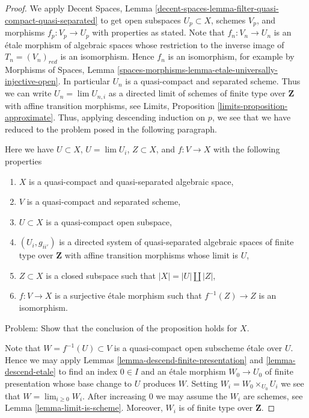 \begin{proof}
We apply Decent Spaces, Lemma
\ref{decent-spaces-lemma-filter-quasi-compact-quasi-separated}
to get open subspaces $U_p \subset X$, schemes $V_p$, and morphisms
$f_p : V_p \to U_p$ with properties as stated. Note that
$f_n : V_n \to U_n$ is an \'etale morphism of algebraic spaces
whose restriction to the inverse image of $T_n = (V_n)_{red}$ is an
isomorphism. Hence $f_n$ is an isomorphism, for example by
Morphisms of Spaces, Lemma
\ref{spaces-morphisms-lemma-etale-universally-injective-open}.
In particular $U_n$ is a quasi-compact and separated scheme.
Thus we can write $U_n = \lim U_{n, i}$ as a directed limit
of schemes of finite type over $\mathbf{Z}$ with affine transition
morphisms, see Limits, Proposition \ref{limits-proposition-approximate}.
Thus, applying descending induction on $p$, we see that we have reduced
to the problem posed in the following paragraph.

\medskip\noindent
Here we have $U \subset X$, $U = \lim U_i$, $Z \subset X$, and
$f : V \to X$ with the following properties
\begin{enumerate}
\item $X$ is a quasi-compact and quasi-separated algebraic space,
\item $V$ is a quasi-compact and separated scheme,
\item $U \subset X$ is a quasi-compact open subspace,
\item $(U_i, g_{ii'})$ is a directed system of quasi-separated algebraic spaces
of finite type over $\mathbf{Z}$ with affine transition morphisms
whose limit is $U$,
\item $Z \subset X$ is a closed subspace such that $|X| = |U| \amalg |Z|$,
\item $f : V \to X$ is a surjective \'etale morphism such that
$f^{-1}(Z) \to Z$ is an isomorphism.
\end{enumerate}
Problem: Show that the conclusion of the proposition holds for $X$.

\medskip\noindent
Note that $W = f^{-1}(U) \subset V$ is a quasi-compact open subscheme
\'etale over $U$. Hence we may apply
Lemmas \ref{lemma-descend-finite-presentation} and \ref{lemma-descend-etale}
to find an index $0 \in I$ and an \'etale morphism $W_0 \to U_0$
of finite presentation whose base change to $U$ produces $W$. Setting
$W_i = W_0 \times_{U_0} U_i$ we see that $W = \lim_{i \geq 0} W_i$. After
increasing $0$ we may assume the $W_i$ are schemes, see
Lemma \ref{lemma-limit-is-scheme}.
Moreover, $W_i$ is of finite type over $\mathbf{Z}$.


\end{proof}

